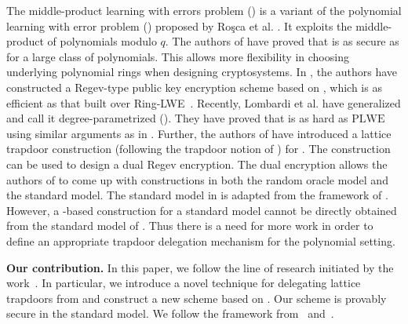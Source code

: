 \documentclass[runningheads]{llncs}
\begin{document}
The middle-product learning with errors problem () is a variant of the polynomial learning with error problem () 
proposed by Ro{\c{s}}ca et al. \cite{RSSS17}.
It exploits the middle-product of polynomials modulo $q$. 
The authors of  \cite{RSSS17} have proved that  is as secure as  for a large class of polynomials.
This allows more flexibility in choosing underlying polynomial rings when designing cryptosystems.
In \cite{RSSS17}, the authors have constructed a Regev-type public key encryption scheme based on , which is as efficient as that built over Ring-LWE~\cite{LPR10}. 
Recently, Lombardi et al. \cite{LVV19} have generalized  
and call it degree-parametrized  ().
They have proved that  is as hard as  $\text{PLWE}$ 
using similar arguments as in \cite{RSSS17}.  
Further, the authors of \cite{LVV19} have introduced a lattice trapdoor construction (following the trapdoor notion of \cite{MP12}) for .
The construction can be used to design a dual Regev encryption. The dual encryption allows the authors of \cite{LVV19} to come up with  constructions  in both the random oracle model and the standard model. The standard model  in \cite{LVV19} is adapted from the  framework of \cite{AB09}. 
However, a -based construction for a standard model  
cannot be directly obtained from the standard model  of \cite{LVV19}.
Thus there is a need for more work in order to define
an appropriate trapdoor delegation mechanism for the polynomial setting.
\vspace{2mm}

\noindent\textbf{Our contribution.}
In this paper, we follow the line of research initiated by the work~\cite{LVV19}.
In particular, we introduce a novel technique for delegating lattice trapdoors 
from  and construct a new  scheme based on .  Our  scheme is provably secure in the standard model.
We follow the framework from~\cite{AB09} and~\cite{LVV19}.
 
\end{document}
